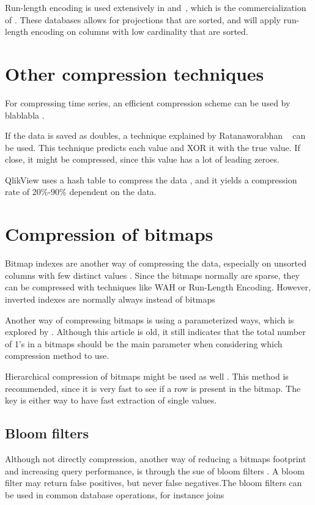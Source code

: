 Run-length encoding is used extensively in \cstore and\vertica~\cite{Barber2012-xt}, which is the commercialization of \cstore. These databases allows for projections that are sorted, and will apply run-length encoding on columns with low cardinality that are sorted.

\section{Other compression techniques}
\label{sec:Other compression techniques}
For compressing time series, an efficient compression scheme can be used by blablabla \cite{Pelkonen2015-ko}.

If the data is saved as doubles, a technique explained by Ratanaworabhan \ea~\cite{Ratanaworabhan2006-wb} can be used. This technique predicts each value and XOR it with the true value. If close, it might be compressed, since this value has a lot of leading zeroes.

QlikView uses a hash table to compress the data \cite{Qlik2014-vd}, and it yields a compression rate of 20\%-90\% dependent on the data.

\section{Compression of bitmaps}
\label{sec:Compression of bitmaps}
Bitmap indexes are another way of compressing the data, especially on unsorted columns with few distinct values \cite{Stonebraker2005-qz}. Since the bitmaps normally are sparse, they can be compressed with techniques like WAH \cite{Bjorklund2011-wh} or Run-Length Encoding. However, inverted indexes are normally always instead of bitmaps \cite{Witten1999-qq}

Another way of compressing bitmaps is using a parameterized ways, which is explored by \cite{Moffat1992-tz}. Although this article is old, it still indicates that the total number of 1's in a bitmaps should be the main parameter when considering which compression method to use.

Hierarchical compression of bitmaps might be used as well \cite{Witten1999-qq}. This method is recommended, since it is very fast to see if a row is present in the bitmap. The key is either way to have fast extraction of single values.

\subsection{Bloom filters}
\label{sub:Bloom filters}
Although not directly compression, another way of reducing a bitmaps footprint and increasing query performance, is through the sue of bloom filters \cite{Bloom1970-nr}. A bloom filter may return false positives, but never false negatives.The bloom filters can be used in common database operations, for instance joins \cite{x}


